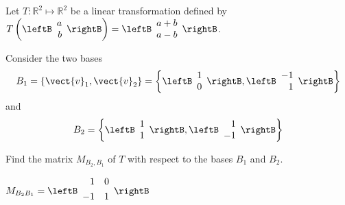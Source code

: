\begin{enumialphparenastyle}
\begin{ex}
Let $T: \mathbb{R}^2 \mapsto \mathbb{R}^2$ be a linear transformation defined by $T \left( \leftB \begin{array}{r}
a \\
b
\end{array} \rightB \right) = \leftB \begin{array}{r}
a+b \\
a-b
\end{array} \rightB$. 

Consider the two bases
\[
B_1 = \left\{ \vect{v}_{1}, \vect{v}_{2} \right\} = \left\{ \leftB \begin{array}{r}
1 \\
0
\end{array}\rightB, \leftB \begin{array}{r}
-1 \\
1
\end{array}
\rightB
\right\}
\]
 and 
\[
B_2 = \left\{ \leftB \begin{array}{r}
1 \\
1
\end{array}
\rightB, \leftB \begin{array}{r}
1 \\
-1
\end{array}
\rightB
\right\}
\]

Find the matrix $M_{B_2,B_1}$ of $T$ with respect to the bases $B_1$ and $B_2$. 
\begin{sol}
$
M_{B_{2} B_{1}} = \leftB
\begin{array}{rr}
\vspace{0.05in}1 & 0 \\
\vspace{0.05in}-1 & 1 
\end{array}
\rightB $
\end{sol}
\end{ex}

\end{enumialphparenastyle}